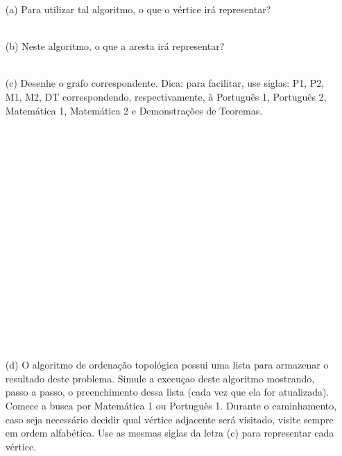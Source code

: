 \documentclass[16pt]{examdesign}
\begin{document}
\begin{fillin}[title={},
                    rearrange=no,resetcounter=no,suppressprefix]
\begin{question}
	  \begin{itemize}
		  \item[(a)] Para utilizar tal algoritmo, o que o vértice irá representar?\\~\\ \blank{~~~~~~~~~~~~~~~~~~~~~~~~~~~~~~~~~~~~~~~~~~~~~~~~~~~~~~~~~~~~~~~~~~~~~~~~~~~~~~~~~~~~~~~~~~~~~~~~~~~~~~~~~~~~~~~~~~~~~~~~~~~~~~~~~~~~~~~~~~~~~~~~~~~~~~~~}
		  \item[(b)] Neste algoritmo, o que a aresta irá representar?\\~\\
		  \blank{~~~~~~~~~~~~~~~~~~~~~~~~~~~~~~~~~~~~~~~~~~~~~~~~~~~~~~~~~~~~~~~~~~~~~~~~~~~~~~~~~~~~~~~~~~~~~~~~~~~~~~~~~~~~~~~~~~~~~~~~~~~~~~~~~~~~~~~~~~~~~~~~~~~~~~~~}
		  \item[(c)] Desenhe o grafo correspondente. Dica: para facilitar, use siglas: P1, P2, M1, M2, DT correspondendo, respectivamente, à Português 1, Português 2, Matemática 1, 
		  Matemática 2 e Demonstrações de Teoremas.
		  ~\\
		  ~\\
		  ~\\
		  ~\\
		  ~\\
		  ~\\
		  ~\\
		  ~\\
		  ~\\
		  ~\\		  ~\\
		  ~\\
		  ~\\
		  ~\\		  ~\\
		  ~\\
		  ~\\
		  ~\\
		  \item[(d)] O algoritmo de ordenação topológica possui uma lista para armazenar o resultado deste problema. 
		  Simule a execuçao deste algoritmo mostrando, passo a passo, o preenchimento dessa lista (cada vez que ela for atualizada). Comece a busca por Matemática 1 ou Português 1. 
		  Durante o caminhamento, caso seja necessário decidir qual vértice adjacente será visitado, visite sempre em ordem alfabética. Use as mesmas siglas da letra (c) para representar cada vértice.
		  

\end{itemize}
\end{question}
\end{fillin}
\end{document}
